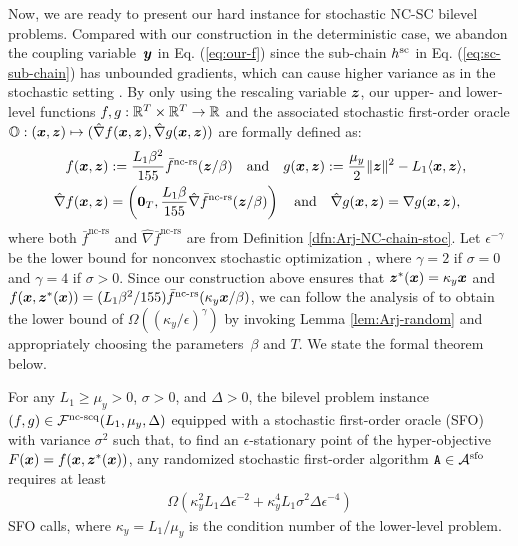 \documentclass{article}
\begin{document}
{Now, we are ready to present our hard instance for stochastic NC-SC bilevel problems. Compared with our construction in the deterministic case, we abandon the coupling variable~${\bm{y}}$ in Eq. (\ref{eq:our-f}) since the sub-chain $h^{\rm sc}$ in Eq. (\ref{eq:sc-sub-chain}) has unbounded gradients, which can cause higher variance as in the stochastic setting \citep{li2021complexity}. By only using the rescaling variable ${\bm{z}}$, our upper- and lower-level functions $f, g: {\mathbb{R}}^T \times {\mathbb{R}}^T \rightarrow {\mathbb{R}}$ and the associated stochastic first-order oracle ${\mathbb{O}}: ({\bm{x}},{\bm{z}}) \mapsto ( \hat \nabla f({\bm{x}},{\bm{z}}),  \hat \nabla g({\bm{x}},{\bm{z}}))$ are formally defined as:}
\begin{align} \label{eq:our-fg-stoc}
\begin{split}
      f({\bm{x}},{\bm{z}})&: = \frac{L_1 \beta^2}{155} \bar f^{\text{nc-rs}}( {\bm{z}} / \beta ) \quad {\rm and} \quad 
    g({\bm{x}},{\bm{z}}): = \frac{\mu_y}{2} \Vert {\bm{z}} \Vert^2 - L_1 \langle {\bm{x}}, {\bm{z}} \rangle, \\
    \hat \nabla f({\bm{x}},{\bm{z}}) &= \left({\bm{0}}_{T}, \frac{L_1 \beta}{155} \hat \nabla \bar f^{\text{nc-rs}}({\bm{z}} / \beta) \right)  \quad {\rm and} \quad
   \hat \nabla g({\bm{x}},{\bm{z}})  = \nabla g({\bm{x}},{\bm{z}}),
\end{split}
\end{align}
where both $\bar f^{\text{nc-rs}}$ and $\hat \nabla \bar f^{\text{nc-rs}}$ are from Definition \ref{dfn:Arj-NC-chain-stoc}. 
Let $\epsilon^{-\gamma}$ be the lower bound for nonconvex stochastic optimization \citep{arjevani2023lower}, where $\gamma = 2$ if $\sigma=  0$ and $\gamma=4$ if $\sigma > 0$. Since our construction above ensures that ${\bm{z}}^*({\bm{x}}) = \kappa_y {\bm{x}} $ and $f({\bm{x}},{\bm{z}}^*({\bm{x}})) = (L_1 \beta^2/ 155)  \bar f^{\text{nc-rs}}( \kappa_y {\bm{x}} / \beta)$, we can follow the analysis of \citep{arjevani2023lower}
to obtain the lower bound of $\Omega( (\kappa_y/ \epsilon)^{\gamma})$ by invoking Lemma \ref{lem:Arj-random} and appropriately choosing the parameters~$\beta$ and $T$.  We state the formal theorem below.

\begin{thm} \label{thm:NC-SC-stoc}
For any $L_1 \ge \mu_y > 0$, $\sigma>0$, and $\Delta >0$, the bilevel problem instance $(f, g) \in {\mathcal{F}}^{\text{nc-scq}}(L_1,\mu_y, \Delta)$ equipped with a stochastic first-order oracle (SFO) with variance $\sigma^2$ such that, to find an $\epsilon$-stationary point of the  hyper-objective $F({\bm{x}}) = f({\bm{x}},{\bm{z}}^*({\bm{x}}))$, any randomized stochastic first-order algorithm $\texttt{A} \in {\mathcal{A}}^{\rm sfo}$ requires at least
\begin{align*}
    \Omega(\kappa_y^2 L_1 \Delta \epsilon^{-2} + \kappa_y^4 L_1 \sigma^2 \Delta \epsilon^{-4})
\end{align*}
SFO calls, where $\kappa_y = L_1/\mu_y$ is the condition number of the lower-level problem.
\end{thm}
\end{document}
